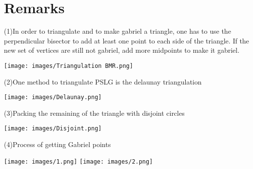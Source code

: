 \documentclass{article}
\begin{document}
\newpage
 
 
\section{Remarks}
 
(1)In order to triangulate and to make gabriel a triangle, one has to use the perpendicular bisector to add at least one point to each side of the triangle. If the new set of vertices are still not gabriel, add more midpoints to make it gabriel.
 
\texttt{[image: images/Triangulation BMR.png]}
\centering
\\
\raggedright
(2)One method to triangulate PSLG is the delaunay triangulation
 
\texttt{[image: images/Delaunay.png]}
\centering
 
\newpage
\raggedright
(3)Packing the remaining of the triangle with disjoint circles
 
\texttt{[image: images/Disjoint.png]}
\centering
 
\raggedright
(4)Process of getting Gabriel points
 
\texttt{[image: images/1.png]}
\centering
\texttt{[image: images/2.png]}
\
\end{document}

